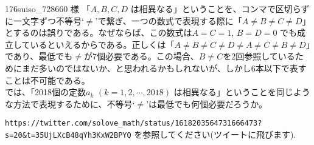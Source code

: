 \begin{thm}{176}{}{suiso\_728660 様}
 「$A, B, C, D$ は相異なる」ということを、コンマで区切らずに一文字ずつ不等号`$\neq$'で繋ぎ、一つの数式で表現する際に「$A\neq B\neq C\neq D$」とするのは誤りである。なぜならば、この数式は$A=C=1$, $B=D=0$ でも成立しているといえるからである。正しくは「$A\neq B\neq C\neq D\neq A\neq C\neq B\neq D$」であり、最低でも$\neq$が7個必要である。この場合、$B\neq C$を2回参照しているためにまだ多いのではないか、と思われるかもしれないが、しかし6本以下で表すことは不可能である。\\
 では、「2018個の定数$a_k$ $(k=1, 2, \cdots, 2018)$ は相異なる」ということを同じような方法で表現するために、不等号`$\neq$'は最低でも何個必要だろうか。
\end{thm}

\verb|https://twitter.com/solove_math/status/1618203564731666473?s=20&t=35UjLXcB48qYh3KxW2BPYQ| 
を参照してください(ツイートに飛びます).  
